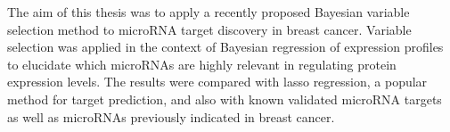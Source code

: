 The aim of this thesis was to apply a recently proposed Bayesian variable
selection method to microRNA target discovery in breast cancer. Variable
selection was applied in the context of Bayesian regression of expression
profiles to elucidate which microRNAs are highly relevant in regulating
protein expression levels. The results were compared with lasso regression, a
popular method for target prediction, and also with known validated microRNA
targets as well as microRNAs previously indicated in breast cancer.

